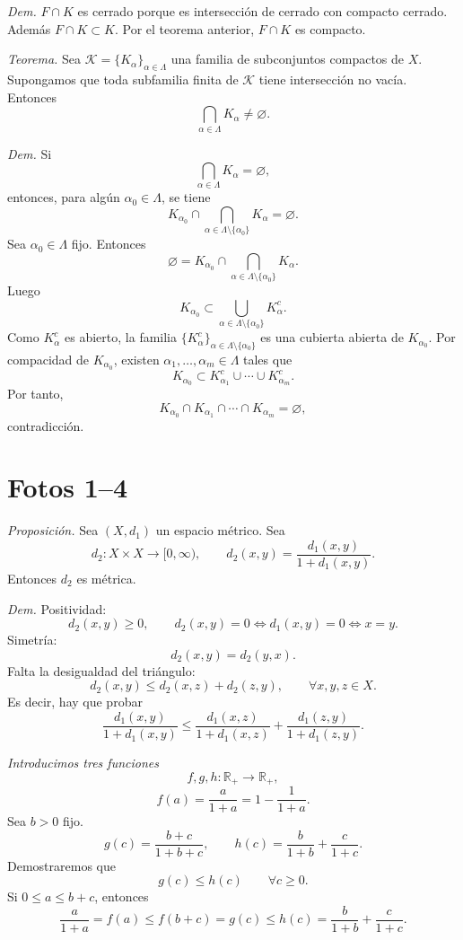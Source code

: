 \documentclass[12pt]{article}
\begin{document}
\textit{Dem.} $F\cap K$ es cerrado porque es intersección de cerrado con compacto cerrado. Además $F\cap K\subset K$. Por el teorema anterior, $F\cap K$ es compacto.

\textit{Teorema.} Sea $\mathcal K=\{K_\alpha\}_{\alpha\in\Lambda}$ una familia de subconjuntos compactos de $X$.
Supongamos que toda subfamilia finita de $\mathcal K$ tiene intersección no vacía. Entonces
\[
\bigcap_{\alpha\in\Lambda}K_\alpha\neq\varnothing.
\]

\textit{Dem.} Si
\[
\bigcap_{\alpha\in\Lambda}K_\alpha=\varnothing,
\]
entonces, para algún $\alpha_0\in\Lambda$, se tiene
\[
K_{\alpha_0}\cap\bigcap_{\alpha\in\Lambda\setminus\{\alpha_0\}}K_\alpha=\varnothing.
\]
Sea $\alpha_0\in\Lambda$ fijo. Entonces
\[
\varnothing=K_{\alpha_0}\cap\bigcap_{\alpha\in\Lambda\setminus\{\alpha_0\}}K_\alpha.
\]
Luego
\[
K_{\alpha_0}\subset \bigcup_{\alpha\in\Lambda\setminus\{\alpha_0\}}K_\alpha^c.
\]
Como $K_\alpha^c$ es abierto, la familia $\{K_\alpha^c\}_{\alpha\in\Lambda\setminus\{\alpha_0\}}$ es una cubierta abierta de $K_{\alpha_0}$.
Por compacidad de $K_{\alpha_0}$, existen $\alpha_1,\dots,\alpha_m\in\Lambda$ tales que
\[
K_{\alpha_0}\subset K_{\alpha_1}^c\cup\cdots\cup K_{\alpha_m}^c.
\]
Por tanto,
\[
K_{\alpha_0}\cap K_{\alpha_1}\cap\cdots\cap K_{\alpha_m}=\varnothing,
\]
contradicción.

\section*{Fotos 1--4}

\textit{Proposición.} Sea $(X,d_1)$ un espacio métrico. Sea
\[
d_2:X\times X\to[0,\infty),\qquad
d_2(x,y)=\frac{d_1(x,y)}{1+d_1(x,y)}.
\]
Entonces $d_2$ es métrica.

\textit{Dem.} Positividad:
\[
d_2(x,y)\ge 0,\qquad d_2(x,y)=0 \iff d_1(x,y)=0 \iff x=y.
\]
Simetría:
\[
d_2(x,y)=d_2(y,x).
\]
Falta la desigualdad del triángulo:
\[
d_2(x,y)\le d_2(x,z)+d_2(z,y),\qquad \forall x,y,z\in X.
\]
Es decir, hay que probar
\[
\frac{d_1(x,y)}{1+d_1(x,y)}
\le
\frac{d_1(x,z)}{1+d_1(x,z)}
+\frac{d_1(z,y)}{1+d_1(z,y)}.
\]

\textit{Introducimos tres funciones}
\[
f,g,h:\mathbb R_+\to\mathbb R_+,
\]
\[
f(a)=\frac a{1+a}=1-\frac1{1+a}.
\]
Sea $b>0$ fijo.
\[
g(c)=\frac{b+c}{1+b+c},
\qquad
h(c)=\frac b{1+b}+\frac c{1+c}.
\]
Demostraremos que
\[
g(c)\le h(c)\qquad \forall c\ge 0.
\]
Si $0\le a\le b+c$, entonces
\[
\frac a{1+a}=f(a)\le f(b+c)=g(c)\le h(c)=\frac b{1+b}+\frac c{1+c}.
\]
\end{document}

